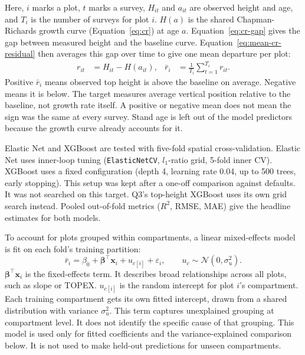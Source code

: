 Here, $i$ marks a plot, $t$ marks a survey, $H_{it}$ and $a_{it}$ are observed height and age, and $T_i$ is the number of surveys for plot $i$. $H(a)$ is the shared Chapman-Richards growth curve (Equation~\eqref{eq:cr}) at age $a$. Equation~\eqref{eq:cr-gap} gives the gap between measured height and the baseline curve. Equation~\eqref{eq:mean-cr-residual} then averages this gap over time to give one mean departure per plot:
\begin{align}
r_{it} &= H_{it} - H(a_{it}), \label{eq:cr-gap} &
\bar{r}_i &= \frac{1}{T_i} \sum_{t=1}^{T_i} r_{it}. \label{eq:mean-cr-residual}
\end{align}
Positive $\bar{r}_i$ means observed top height is above the baseline on average. Negative means it is below. The target measures average vertical position relative to the baseline, not growth rate itself. A positive or negative mean does not mean the sign was the same at every survey. Stand age is left out of the model predictors because the growth curve already accounts for it.

Elastic Net and XGBoost are tested with five-fold spatial cross-validation. Elastic Net uses inner-loop tuning (\texttt{ElasticNetCV}, $l_1$-ratio grid, 5-fold inner CV). XGBoost uses a fixed configuration (depth 4, learning rate 0.04, up to 500 trees, early stopping). This setup was kept after a one-off comparison against defaults. It was not searched on this target. Q3's top-height XGBoost uses its own grid search instead. Pooled out-of-fold metrics ($R^2$, RMSE, MAE) give the headline estimates for both models.

To account for plots grouped within compartments, a linear mixed-effects model is fit on each fold's training partition:
\begin{equation}
\bar{r}_i = \beta_0 + \boldsymbol{\beta}^{\top}\mathbf{x}_i + u_{c[i]} + \varepsilon_i, \qquad u_c \sim \mathcal{N}(0, \sigma_u^2).
\label{eq:mixed-effects}
\end{equation}
$\boldsymbol{\beta}^{\top}\mathbf{x}_i$ is the fixed-effects term. It describes broad relationships across all plots, such as slope or TOPEX. $u_{c[i]}$ is the random intercept for plot $i$'s compartment. Each training compartment gets its own fitted intercept, drawn from a shared distribution with variance $\sigma_u^2$. This term captures unexplained grouping at compartment level. It does not identify the specific cause of that grouping. This model is used only for fitted coefficients and the variance-explained comparison below. It is not used to make held-out predictions for unseen compartments.

